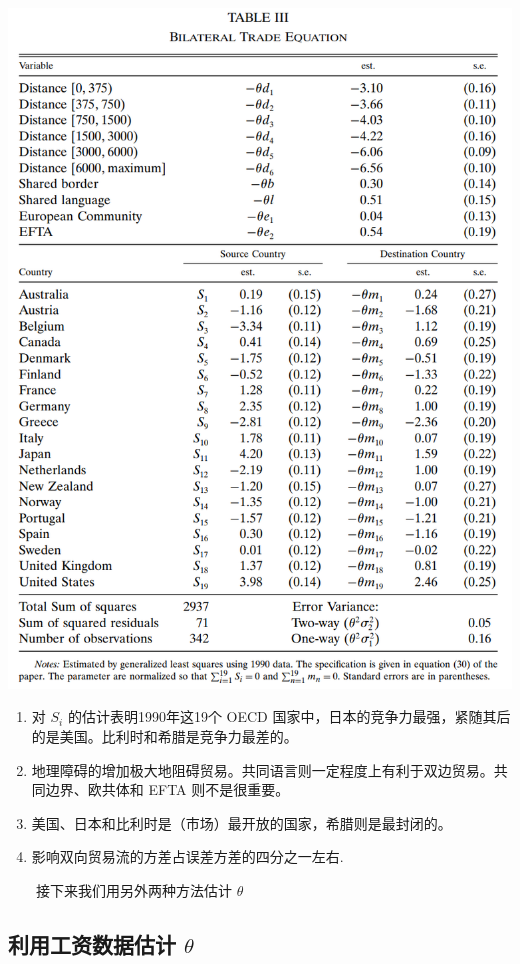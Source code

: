 \documentclass[]{article}
\providecommand{\tightlist}{%
  \setlength{\itemsep}{0pt}\setlength{\parskip}{0pt}}
\begin{document}
\begin{center}\includegraphics[width=0.8\linewidth]{Figures/Table3} \end{center}

\begin{enumerate}
\def\labelenumi{\arabic{enumi}.}
\tightlist
\item
  对 \(S_i\) 的估计表明1990年这19个 OECD 国家中，日本的竞争力最强，紧随其后的是美国。比利时和希腊是竞争力最差的。\\
\item
  地理障碍的增加极大地阻碍贸易。共同语言则一定程度上有利于双边贸易。共同边界、欧共体和 EFTA 则不是很重要。\\
\item
  美国、日本和比利时是（市场）最开放的国家，希腊则是最封闭的。\\
\item
  影响双向贸易流的方差占误差方差的四分之一左右.
\end{enumerate}

　　接下来我们用另外两种方法估计 \(\theta\)

\hypertarget{theta-1}{%
\subsection{\texorpdfstring{利用工资数据估计 \(\theta\)}{利用工资数据估计 \textbackslash theta}}\label{theta-1}}
\end{document}
